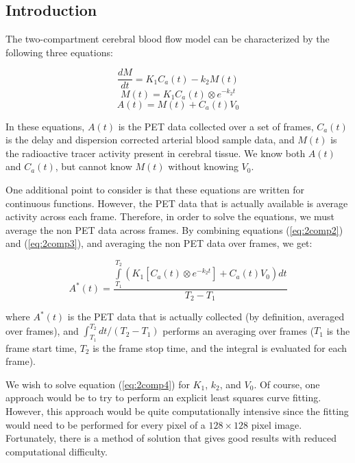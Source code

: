 \subsection{Introduction}

The two-compartment cerebral blood flow model can be characterized by
the following three equations:

\begin{equation}
\frac{dM}{dt} = K_{1}C_{a}(t) - k_{2}M(t)      \label{eq:2comp1}
\end{equation}
\begin{equation}
M(t) = K_{1}C_{a}(t) \otimes e^{-k_{2}t}       \label{eq:2comp2}
\end{equation}
\begin{equation}
A(t) = M(t) + C_{a}(t)V_{0}                    \label{eq:2comp3}
\end{equation}

In these equations, $A(t)$ is the PET data collected over a set of
frames, $C_{a}(t)$ is the delay and dispersion corrected arterial
blood sample data, and $M(t)$ is the radioactive tracer activity
present in cerebral tissue.  We know both $A(t)$ and $C_{a}(t)$, but
cannot know $M(t)$ without knowing $V_{0}$.

One additional point to consider is that these equations are written
for continuous functions.  However, the PET data that is actually
available is average activity across each frame.  Therefore, in
order to solve the equations, we must average the non PET data
across frames.  By combining equations (\ref{eq:2comp2}) and
(\ref{eq:2comp3}), and averaging the non PET data over frames, we
get:

\begin{equation}
A^{*}(t) = \frac{\int\limits_{T_1}^{T_2} \left( K_{1} \left[ C_{a}(t) \otimes
  e^{-k_{2}t} \right] + C_{a}(t)V_{0} \right) dt}{T_{2} - T_{1}}
\label{eq:2comp4}
\end{equation}

where $A^{*}(t)$ is the PET data that is actually collected (by
definition, averaged over frames), and ${\int_{T_1}^{T_2}dt} / {(T_2 -
T_1)}$ performs an averaging over frames ($T_1$ is the frame start
time, $T_2$ is the frame stop time, and the integral is evaluated for
each frame).

We wish to solve equation (\ref{eq:2comp4}) for $K_{1}$, $k_{2}$, and
$V_{0}$.  Of course, one approach would be to try to perform an
explicit least squares curve fitting.  However, this approach would be
quite computationally intensive since the fitting would need to be
performed for every pixel of a $128 \times 128$ pixel image.  Fortunately,
there is a method of solution that gives good results with reduced
computational difficulty.

